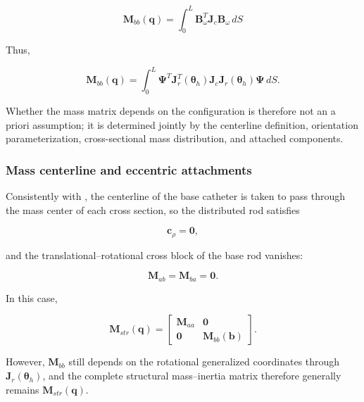 \begin{equation}
\label{eq:galerkin-2-43}
\boxed{\mathbf{M}_{bb}\left( \mathbf{q} \right) = \int_{0}^{L}\mathbf{B}_{\omega}^{T}\mathbf{J}_{c}\mathbf{B}_{\omega}\, dS}
\end{equation}

Thus,

\begin{equation}
\label{eq:galerkin-2-44}
\mathbf{M}_{bb}\left( \mathbf{q} \right) = \int_{0}^{L}\bm{\Psi}^{T}\mathbf{J}_{r}^{T}\left( \bm{\theta}_{h} \right)\mathbf{J}_{c}\mathbf{J}_{r}\left( \bm{\theta}_{h} \right)\bm{\Psi}\, dS.
\end{equation}

Whether the mass matrix depends on the configuration is therefore not an a priori assumption; it is determined jointly by the centerline definition, orientation parameterization, cross-sectional mass distribution, and attached components.

\subsubsection{Mass centerline and eccentric attachments}\label{sec:galerkin-2-4-4}

Consistently with , the centerline of the base catheter is taken to pass through the mass center of each cross section, so the distributed rod satisfies

\begin{equation}
\label{eq:galerkin-2-45}
\mathbf{c}_{\rho} = \mathbf{0},
\end{equation}

and the translational--rotational cross block of the base rod vanishes:

\begin{equation}
\label{eq:galerkin-2-46}
\mathbf{M}_{ab} = \mathbf{M}_{ba} = \mathbf{0}.
\end{equation}

In this case,

\begin{equation}
\label{eq:galerkin-2-47}
\mathbf{M}_{str}\left( \mathbf{q} \right) = \begin{bmatrix}
\mathbf{M}_{aa} & \mathbf{0} \\
\mathbf{0} & \mathbf{M}_{bb}\left( \mathbf{b} \right)
\end{bmatrix}.
\end{equation}

However, \(\mathbf{M}_{bb}\) still depends on the rotational generalized coordinates through \(\mathbf{J}_{r}\left( \bm{\theta}_{h} \right)\), and the complete structural mass--inertia matrix therefore generally remains \(\mathbf{M}_{str}\left( \mathbf{q} \right)\).

